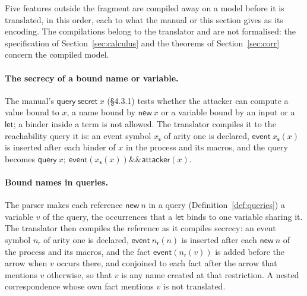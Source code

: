 \documentclass[11pt]{article}
\theoremstyle{definition}
\theoremstyle{plain}
\theoremstyle{remark}
\begin{document}
Five features outside the fragment are compiled away on a model before it is translated, in this order, each to what the manual or this section gives as its encoding. The compilations belong to the translator and are not formalised: the specification of Section~\ref{sec:calculus} and the theorems of Section~\ref{sec:corr} concern the compiled model.

\paragraph{The secrecy of a bound name or variable.} The manual's $\mathsf{query}\ \mathsf{secret}\ x$ (\S4.3.1) tests whether the attacker can compute a value bound to $x$, a name bound by $\mathsf{new}\ x$ or a variable bound by an input or a $\mathsf{let}$; a binder inside a term is not allowed. The translator compiles it to the reachability query it is: an event symbol $x_{\mathsf{s}}$ of arity one is declared, $\mathsf{event}\ x_{\mathsf{s}}(x)$ is inserted after each binder of $x$ in the process and its macros, and the query becomes $\mathsf{query}\ x;\ \mathsf{event}(x_{\mathsf{s}}(x))\mathbin{\&\&}\mathsf{attacker}(x)$.

\paragraph{Bound names in queries.} The parser makes each reference $\mathsf{new}\ n$ in a query (Definition~\ref{def:queries}) a variable $v$ of the query, the occurrences that a $\mathsf{let}$ binds to one variable sharing it. The translator then compiles the reference as it compiles secrecy: an event symbol $n_{\mathsf{r}}$ of arity one is declared, $\mathsf{event}\ n_{\mathsf{r}}(n)$ is inserted after each $\mathsf{new}\ n$ of the process and its macros, and the fact $\mathsf{event}(n_{\mathsf{r}}(v))$ is added before the arrow when $v$ occurs there, and conjoined to each fact after the arrow that mentions $v$ otherwise, so that $v$ is any name created at that restriction. A nested correspondence whose own fact mentions $v$ is not translated.
\end{document}
